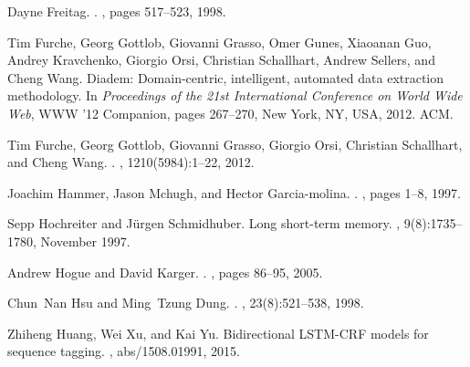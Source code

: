 \documentclass{nle}
\begin{document}
\begin{thebibliography}{}
Dayne Freitag.
.
,
  pages 517--523, 1998.

Tim Furche, Georg Gottlob, Giovanni Grasso, Omer Gunes, Xiaoanan Guo, Andrey
  Kravchenko, Giorgio Orsi, Christian Schallhart, Andrew Sellers, and Cheng
  Wang.
\newblock Diadem: Domain-centric, intelligent, automated data extraction
  methodology.
\newblock In {\em Proceedings of the 21st International Conference on World
  Wide Web}, WWW '12 Companion, pages 267--270, New York, NY, USA, 2012. ACM.

Tim Furche, Georg Gottlob, Giovanni Grasso, Giorgio Orsi, Christian Schallhart,
  and Cheng Wang.
.
, 1210(5984):1--22, 2012.

Joachim Hammer, Jason Mchugh, and Hector Garcia-molina.
.
, pages 1--8, 1997.

Sepp Hochreiter and J\"{u}rgen Schmidhuber.
\newblock Long short-term memory.
, 9(8):1735--1780, November 1997.

Andrew Hogue and David Karger.
.
, pages 86--95, 2005.

Chun~Nan Hsu and Ming~Tzung Dung.
.
, 23(8):521--538, 1998.

Zhiheng Huang, Wei Xu, and Kai Yu.
\newblock Bidirectional {LSTM-CRF} models for sequence tagging.
, abs/1508.01991, 2015.


\end{thebibliography}
\end{document}
